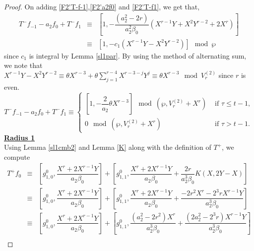 \documentclass[10pt,a4paper]{amsart}
\begin{document}
\begin{proof}
 
 On adding \eqref{F2'T-f-1},\eqref{F2'a2f0} and \eqref{F2'T-f1}, we get that,
 \begin{eqnarray}
T^{-}f_{-1}-a_{2}f_{0}+T^{-}f_{1} &\equiv& \left[1, -\dfrac{(a_{2}^2-2r)}{a_{2}^2\beta_{0}}(X^{r-1}Y+X^2Y^{r-2}+2X^r)\right] \nonumber\\
&\equiv& \left[1, -c_{1}(X^{r-1}Y-X^2Y^{r-2})\right]\mod\wp \nonumber
\end{eqnarray}
 since $c_{1}$ is integral by Lemma \ref{sl1par}.  
By using the method of alternating sum, we note that $X^{r-1}Y-X^{2}Y^{r-2} \equiv \theta X^{r-3} + \theta \displaystyle\sum_{j=1}^{r-4}X^{r-3-j}Y^{j} \equiv \theta X^{r-3} \mod V_{r}^{(2)}$ since $r$ is even. 
\begin{equation}\label{sl1F2'rad0}
T^{-}f_{-1}-a_{2}f_{0}+T^{-}f_{1} \equiv \begin{cases} 
\left[   1, -\dfrac{2}{a_{2}}\theta X^{r-3}\right] \mod(\wp, V_{r}^{(2)}+X^{r}) & \text{ if }\tau\leq t-1,\\
0 \mod(\wp, V_{r}^{(2)}+X^{r}) & \text{ if } \tau>t-1. 
\end{cases}
\end{equation}
\noindent\underline{\textbf{Radius 1}}\\
Using Lemma \ref{sl1cmb2} and Lemma \ref{K} along with the definition of $T^+$, we compute
\begin{eqnarray}\label{F2'T+f0}
    T^{+}f_{0} &\equiv& \left[g_{1,0}^{0}, \dfrac{X^{r}+ 2X^{r-1}Y}{a_{2}\beta_{0}}\right] + \left[g_{1,1}^{0}, \dfrac{X^{r}+2X^{r-1}Y}{a_{2}\beta_{0}}+\dfrac{2r}{a_{2}^{3}\beta_{0}}K(X,2Y-X) \right] \nonumber\\
    &\equiv& \left[g_{1,0}^{0},\dfrac{X^{r}+ 2X^{r-1}Y}{a_{2}\beta_{0}}\right]+ \left[g_{1,1}^{0}, \dfrac{X^{r}+ 2X^{r-1}Y}{a_{2}\beta_{0}} + \dfrac{-2r^2X^{r}-2^3rX^{r-1}Y}{a_{2}^3\beta_{0}}   \right] \nonumber\\
    &\equiv& \left[g_{1,0}^{0},\dfrac{X^{r}+ 2X^{r-1}Y}{a_{2}\beta_{0}}\right]+ \left[g_{1,1}^{0}, \dfrac{(a_{2}^2-2r^2)X^{r}}{a_{2}^3\beta_{0}} + \dfrac{(2a_{2}^2-2^3r)X^{r-1}Y}{a_{2}^3\beta_{0}}   \right] \nonumber\\

\end{eqnarray}
\end{proof}
\end{document}
